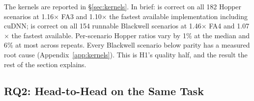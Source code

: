 The kernels are reported in \S\ref{sec:kernels}. In brief: \fathree is correct on all 182 Hopper
scenarios at 1.16$\times$ FA3 and 1.10$\times$ the fastest available implementation including cuDNN;
\fafour is correct on all 154 runnable Blackwell scenarios at 1.46$\times$ FA4 and 1.07$\times$ the
fastest available. Per-scenario Hopper ratios vary by 1\% at the median and 6\% at most across
repeats. Every Blackwell scenario below parity has a measured root cause (Appendix~\ref{app:kernels}).
This is H1's quality half, and the result the rest of the section explains.

\subsection{RQ2: Head-to-Head on the Same Task}
\label{sec:eval-h2h}

